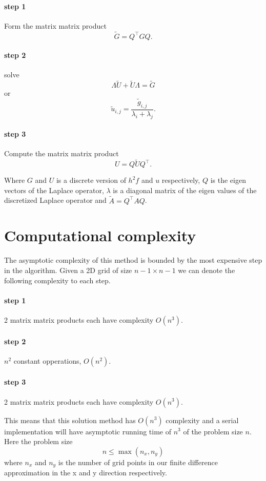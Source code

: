 \documentclass{article}
\begin{document}
\paragraph{step 1}
Form the matrix matrix product
\[
\tilde{G} = Q^\top G Q.
\]
\paragraph{step 2}
solve
\[
\Lambda \tilde{U} + \tilde{U} \Lambda = \tilde{G}
\]
or
\[
\tilde{u}_{i,j} = \frac{\tilde{g}_{i,j}}{\lambda_i + \lambda_j}.
\]
\paragraph{step 3}
Compute the matrix matrix product
\[
U = Q \tilde{U} Q^\top.
\]

Where $G$ and $U$ is a discrete version of $h^2 f$ and $u$ respectively, $Q$ is the eigen vectors of the Laplace operator,
$\lambda$ is a diagonal matrix of the eigen values of the discretized Laplace operator and $\tilde{A} = Q^\top A Q$.

\section{Computational complexity}
The asymptotic complexity of this method is bounded by the most expensive step
in the algorithm.
Given a 2D grid of size $n-1 \times n-1$ we can denote the following complexity to each step.
\paragraph{step 1}
2 matrix matrix products each have complexity $O(n^3)$.
\paragraph{step 2}
$n^2$ constant opperations, $O(n^2)$.
\paragraph{step 3}
2 matrix matrix products each have complexity $O(n^3)$.

This means that this solution method has $O(n^3)$ complexity and a serial implementation
will have asymptotic running time of $n^3$ of the problem size $n$. Here the problem size
\[
n \leq \max(n_x,n_y)
\]
where $n_x$ and $n_y$ is the number of grid points in our finite difference approximation
in the x and y direction respectively.
\end{document}
